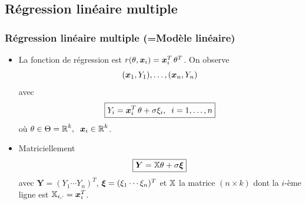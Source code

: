 \subsection{Régression linéaire multiple}

\begin{frame}
\frametitle{Régression linéaire multiple (=Modèle linéaire)}
\begin{itemize}
\item La fonction de régression est $r(\theta,\operatorname{\boldsymbol{x}}_i) = \operatorname{\boldsymbol{x}}_i^T \theta^T$.
On observe
$$(\operatorname{\boldsymbol{x}}_1,Y_1),\ldots, (\operatorname{\boldsymbol{x}}_n,Y_n)$$
avec
$$\boxed{Y_i = \operatorname{\boldsymbol{x}}_i^T \theta+ \sigma \xi_i,\;\;i=1,\ldots, n}$$
où $\theta \in \Theta = \operatorname{{\mathbb R}}^k,\;\;\operatorname{\boldsymbol{x}}_i \in \operatorname{{\mathbb R}}^k$.
\item \alert{Matriciellement}
$$\boxed{\boldsymbol{Y} = \mathbb{X}\theta + \sigma \boldsymbol{\xi}}$$
avec $\boldsymbol{Y} = (Y_1 \cdots Y_n)^T$, $\boldsymbol{\xi} =
(\xi_1 \cdots \xi_n)^T$ et $\mathbb{X}$ la matrice $(n\times k)$
dont la $i$-ème ligne est $\mathbb{X}_{i,\cdot}= \operatorname{\boldsymbol{x}}_i^T$.
\end{itemize}
\end{frame}

%





